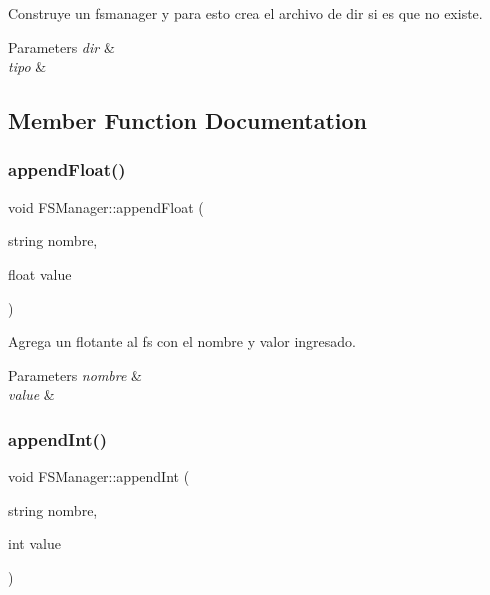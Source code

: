 Construye un fsmanager y para esto crea el archivo de \textquotesingle{}dir\textquotesingle{} si es que no existe. 


\begin{DoxyParams}{Parameters}
{\em dir} & \\
\hline
{\em tipo} & \\
\hline
\end{DoxyParams}


\subsection{Member Function Documentation}
\mbox{\label{classFSManager_ae0719c62b330a8053d65fc519f1afb38}} 
\subsubsection{\texorpdfstring{append\+Float()}{appendFloat()}}
{\footnotesize\ttfamily void F\+S\+Manager\+::append\+Float (\begin{DoxyParamCaption}\item[{string}]{nombre,  }\item[{float}]{value }\end{DoxyParamCaption})\hspace{0.3cm}{\ttfamily [inline]}}



Agrega un flotante al fs con el nombre y valor ingresado. 


\begin{DoxyParams}{Parameters}
{\em nombre} & \\
\hline
{\em value} & \\
\hline
\end{DoxyParams}
\mbox{\label{classFSManager_a3e4672be75f6edf00336adf883571963}} 
\subsubsection{\texorpdfstring{append\+Int()}{appendInt()}}
{\footnotesize\ttfamily void F\+S\+Manager\+::append\+Int (\begin{DoxyParamCaption}\item[{string}]{nombre,  }\item[{int}]{value }\end{DoxyParamCaption})\hspace{0.3cm}{\ttfamily [inline]}}



